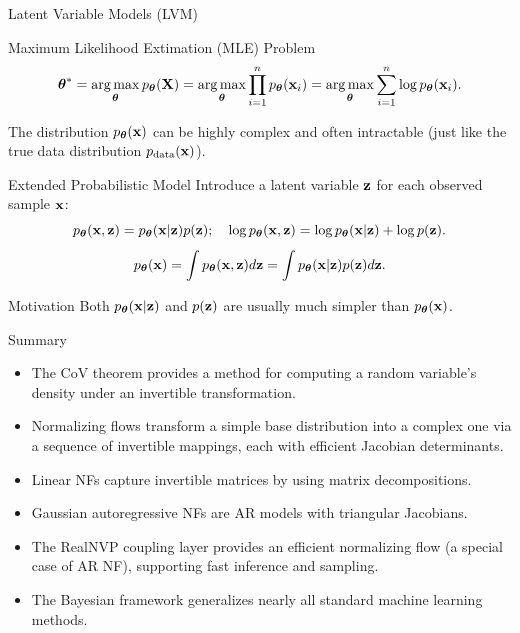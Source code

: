 \documentclass{beamer}
\renewcommand{\eqpause}{}
\renewcommand{\nextonslide}[1]{#1}
\begin{document}
\begin{frame}{Latent Variable Models (LVM)}
	\begin{block}{Maximum Likelihood Extimation (MLE) Problem}
		\vspace{-0.7cm}
		\[
			\boldsymbol{\theta}^* = \operatorname*{arg\,max}_{\boldsymbol{\theta}} p_{\boldsymbol{\theta}}(\mathbf{X}) = \operatorname*{arg\,max}_{\boldsymbol{\theta}} \prod_{i=1}^n p_{\boldsymbol{\theta}}(\mathbf{x}_i) = \operatorname*{arg\,max}_{\boldsymbol{\theta}} \sum_{i=1}^n \log p_{\boldsymbol{\theta}}(\mathbf{x}_i).
		\]
		\vspace{-0.5cm}
	\end{block}
    \eqpause
	The distribution $p_{\boldsymbol{\theta}}(\mathbf{x})$ can be highly complex and often intractable (just like the true data distribution $p_{\text{data}}(\mathbf{x})$).
    \eqpause
	\begin{block}{Extended Probabilistic Model}
		Introduce a latent variable $\mathbf{z}$ for each observed sample $\mathbf{x}$:
		\[
			p_{\boldsymbol{\theta}}(\mathbf{x}, \mathbf{z}) = p_{\boldsymbol{\theta}}(\mathbf{x} | \mathbf{z}) p(\mathbf{z}); \quad 
		\log p_{\boldsymbol{\theta}}(\mathbf{x}, \mathbf{z}) = \log p_{\boldsymbol{\theta}}(\mathbf{x} | \mathbf{z}) + \log p(\mathbf{z}).
		\]
		\[
			\nextonslide{\pt(\bx) = \int \pt(\bx, \bz) d\bz = \int \pt(\bx | \bz) p(\bz) d\bz.}
		\]
	\end{block}
    \eqpause
	\vspace{-0.3cm}
	\begin{block}{Motivation}
		Both $p_{\boldsymbol{\theta}}(\mathbf{x} | \mathbf{z})$ and $p(\mathbf{z})$ are usually much simpler than $p_{\boldsymbol{\theta}}(\mathbf{x})$.
	\end{block}
\end{frame}
\begin{frame}{Summary}
	\begin{itemize}
		\item The CoV theorem provides a method for computing a random variable's density under an invertible transformation.
		\vfill
		\item Normalizing flows transform a simple base distribution into a complex one via a sequence of invertible mappings, each with efficient Jacobian determinants.
		\vfill
		\item Linear NFs capture invertible matrices by using matrix decompositions.
		\vfill
		\item Gaussian autoregressive NFs are AR models with triangular Jacobians.
		\vfill
		\item The RealNVP coupling layer provides an efficient normalizing flow (a special case of AR NF), supporting fast inference and sampling.
		\vfill
		\item The Bayesian framework generalizes nearly all standard machine learning methods.
	\end{itemize}
\end{frame}
\end{document}
